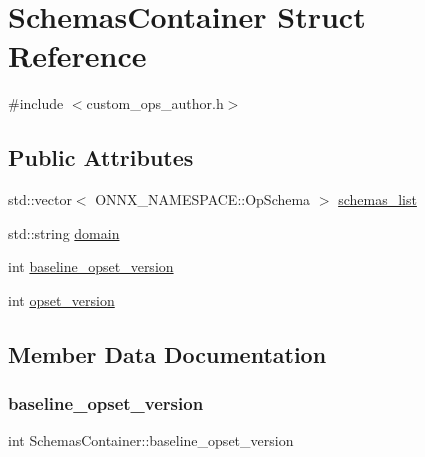 \hypertarget{structSchemasContainer}{}\section{Schemas\+Container Struct Reference}
\label{structSchemasContainer}


{\ttfamily \#include $<$custom\+\_\+ops\+\_\+author.\+h$>$}

\subsection*{Public Attributes}
\begin{DoxyCompactItemize}
\item 
std\+::vector$<$ O\+N\+N\+X\+\_\+\+N\+A\+M\+E\+S\+P\+A\+C\+E\+::\+Op\+Schema $>$ \mbox{\hyperlink{structSchemasContainer_a56ef485d5bb59e9af7d0c002b0fa57a4}{schemas\+\_\+list}}
\item 
std\+::string \mbox{\hyperlink{structSchemasContainer_a3cd5134e2bf9e13e97927f4ea6f4196f}{domain}}
\item 
int \mbox{\hyperlink{structSchemasContainer_af63cb1307f8638f5d9f22b3602cae565}{baseline\+\_\+opset\+\_\+version}}
\item 
int \mbox{\hyperlink{structSchemasContainer_ae52bed3124f96eec09bbaae06c324675}{opset\+\_\+version}}
\end{DoxyCompactItemize}


\subsection{Member Data Documentation}
\mbox{\label{structSchemasContainer_af63cb1307f8638f5d9f22b3602cae565}} 
\subsubsection{\texorpdfstring{baseline\+\_\+opset\+\_\+version}{baseline\_opset\_version}}
{\footnotesize\ttfamily int Schemas\+Container\+::baseline\+\_\+opset\+\_\+version}

\mbox{\label{structSchemasContainer_a3cd5134e2bf9e13e97927f4ea6f4196f}} 

